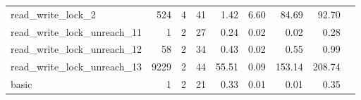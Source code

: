 {\begin{tabular}{l|r|r|r|r|r|r|r|l}
read\_write\_lock\_2                        & 524                                                                                               & 4                                                                                                & 41                                                                                                                   & 1.42                            & 6.60                    & {\color[HTML]{00009B} 84.69}   & 92.70                      \\
read\_write\_lock\_unreach\_11              & 1                                                                                                 & 2                                                                                                & 27                                                                                                                   & 0.24                            & 0.02                    & {\color[HTML]{00009B} 0.02}    & 0.28                       \\
read\_write\_lock\_unreach\_12              & 58                                                                                                & 2                                                                                                & 34                                                                                                                   & 0.43                            & 0.02                    & {\color[HTML]{00009B} 0.55}    & 0.99                       \\
read\_write\_lock\_unreach\_13              & 9229                                                                                              & 2                                                                                                & 44                                                                                                                   & 55.51                           & 0.09                    & {\color[HTML]{00009B} 153.14}  & 208.74                     \\
basic                                       & 1                                                                                                 & 2                                                                                                & 21                                                                                                                   & 0.33                            & 0.01                    & {\color[HTML]{00009B} 0.01}    & 0.35                       &                                                         \\

\end{tabular}}
